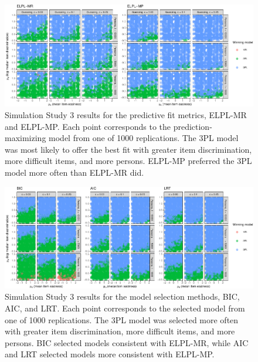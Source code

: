 \documentclass[
  english,
  man,floatsintext]{apa7}
\begin{document}
\begin{figure}

{\centering \includegraphics[width=2100px]{irt-predictive-fit-apa_files/figure-latex/results5b1-1} 

}

\caption{Simulation Study 3 results for the predictive fit metrics, ELPL-MR and ELPL-MP. Each point corresponds to the prediction-maximizing model from one of 1000 replications. The 3PL model was most likely to offer the best fit with greater item discrimination, more difficult items, and more persons. ELPL-MP preferred the 3PL model more often than ELPL-MR did.}\label{fig:results5b1}
\end{figure}

\begin{figure}

{\centering \includegraphics[width=2100px]{irt-predictive-fit-apa_files/figure-latex/results5b2-1} 

}

\caption{Simulation Study 3 results for the model selection methods, BIC, AIC, and LRT. Each point corresponds to the selected model from one of 1000 replications. The 3PL model was selected more often with greater item discrimination, more difficult items, and more persons. BIC selected models consistent with ELPL-MR, while AIC and LRT selected models more consistent with ELPL-MP.}\label{fig:results5b2}
\end{figure}
\end{document}
